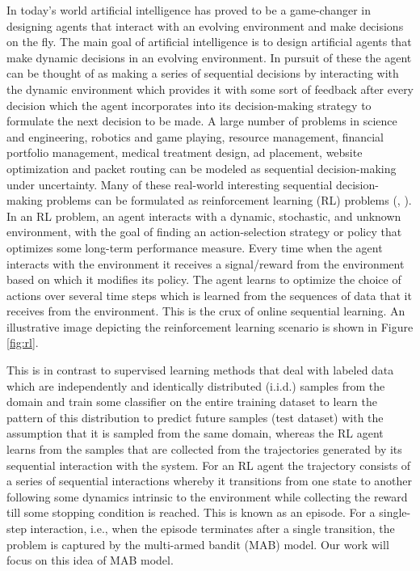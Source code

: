 In today's world artificial intelligence has proved to be a game-changer in designing agents that interact with an evolving environment and make decisions on the fly. The main goal of artificial intelligence is to design artificial agents that make dynamic decisions in an evolving environment. In pursuit of these the agent can be thought of as making a series of  sequential decisions by interacting with the dynamic environment which provides it with some sort of feedback after every decision which the agent incorporates into its decision-making strategy to formulate the next decision to be made. A large number of problems in science and engineering, robotics and game playing, resource management, financial portfolio management, medical treatment design, ad placement, website optimization and packet routing can be modeled as sequential decision-making under uncertainty. Many of these real-world interesting
sequential decision-making problems can be formulated as reinforcement learning (RL) problems (\citep{bertsekas1996neuro}, \citep{sutton1998reinforcement}). In an RL problem, an agent interacts with a dynamic, stochastic, and unknown environment, with the goal of finding an action-selection strategy or policy that optimizes some long-term performance measure. Every time when the agent interacts with the environment it receives a signal/reward from the environment based on which it modifies its policy. The agent learns to optimize the choice of actions over several time steps which is learned from the sequences of data that it receives from the environment. This is the crux of online sequential learning. An illustrative image depicting the reinforcement learning scenario is shown in Figure \ref{fig:rl}.

	This is in contrast to supervised learning methods that deal with labeled data which are independently and identically distributed (i.i.d.) samples from the domain and train some classifier on the entire training dataset to learn the pattern of this distribution to predict future samples (test dataset) with the assumption that it is sampled from the same domain, whereas the RL agent learns from the samples that are collected from the trajectories generated by its sequential interaction with the system. For an RL agent the trajectory consists of a series of sequential interactions whereby it transitions from one state to another following some dynamics intrinsic to the environment while collecting the reward till some stopping condition is reached. This is known as an episode. For a single-step interaction, i.e., when the episode terminates after a single transition, the problem is captured by the multi-armed bandit (MAB) model. Our work will focus on this idea of MAB model.

